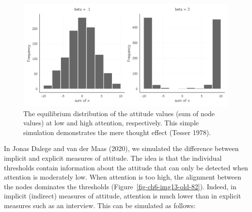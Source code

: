 \documentclass[
  a4paper,
  DIV=11,
  numbers=noendperiod,
  oneside]{scrreprt}
\begin{document}
\begin{figure}

{\centering \includegraphics{media/ch6/fig-ch6-img12-old-81.jpg}

}

\caption{\label{fig-ch6-img12-old-81}The equilibrium distribution of the
attitude values (sum of node values) at low and high attention,
respectively. This simple simulation demonstrates the mere thought
effect (Tesser 1978).}

\end{figure}

In Jonas Dalege and van der Maas (2020), we simulated the difference
between implicit and explicit measures of attitude. The idea is that the
individual thresholds contain information about the attitude that can
only be detected when attention is moderately low. When attention is too
high, the alignment between the nodes dominates the thresholds
(Figure~\ref{fig-ch6-img13-old-82}). Indeed, in implicit (indirect)
measures of attitude, attention is much lower than in explicit measures
such as an interview. This can be simulated as follows:
\end{document}
